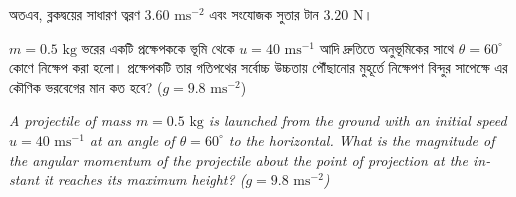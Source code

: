 \documentclass[12pt, a4paper]{article}
\begin{document}
{\begin{tcolorbox}[solutionbox={সমাধান (Solution)}]
অতএব, ব্লকদ্বয়ের সাধারণ ত্বরণ $3.60\text{ ms}^{-2}$ এবং সংযোজক সুতার টান $3.20\text{ N}$।
\end{tcolorbox}
\vspace{1em}

\begin{tcolorbox}[questionbox={প্রশ্ন (Question) 43}]
\noindent
$m = 0.5\text{ kg}$ ভরের একটি প্রক্ষেপককে ভূমি থেকে $u = 40\text{ ms}^{-1}$ আদি দ্রুতিতে অনুভূমিকের সাথে $\theta = 60^\circ$ কোণে নিক্ষেপ করা হলো। প্রক্ষেপকটি তার গতিপথের সর্বোচ্চ উচ্চতায় পৌঁছানোর মুহূর্তে নিক্ষেপণ বিন্দুর সাপেক্ষে এর কৌণিক ভরবেগের মান কত হবে? ($g = 9.8\text{ ms}^{-2}$)

\vspace{0.8em}
\begin{english}
\noindent\textit{\color{darkgray}
A projectile of mass $m = 0.5\text{ kg}$ is launched from the ground with an initial speed $u = 40\text{ ms}^{-1}$ at an angle of $\theta = 60^\circ$ to the horizontal. What is the magnitude of the angular momentum of the projectile about the point of projection at the instant it reaches its maximum height? ($g = 9.8\text{ ms}^{-2}$)
}
\end{english}
\end{tcolorbox}

\vspace{1em}
\begin{center}
\end{center}}
\end{document}
